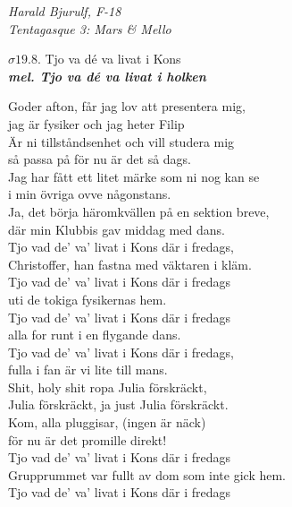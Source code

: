 \documentclass[a6paper,10pt]{article}
\newcommand{\mel}[1]{\small\textbf{\textit{mel. #1 \\}}}
\begin{document}
\begin{flushright}
\textit{Harald Bjurulf, F-18 \\ Tentagasque 3: Mars \& Mello}
\end{flushright}

\setlength{\oddsidemargin}{-0.47in}
\begin{center}


\Large $\sigma19.8$. Tjo va dé va livat i Kons \\
\mel{Tjo va dé va livat i holken}
\end{center} \small
Goder afton, får jag lov att presentera mig,\\
jag är fysiker och jag heter Filip\\
Är ni tillståndsenhet och vill studera mig\\
så passa på för nu är det så dags.\\
Jag har fått ett litet märke som ni nog kan se\\
i min övriga ovve någonstans.\\
Ja, det börja häromkvällen på en sektion breve,\\
där min Klubbis gav middag med dans.
\vspace{5pt}\\
Tjo vad de’ va’ livat i Kons där i fredags,\\
Christoffer, han fastna med väktaren i kläm.\\
Tjo vad de’ va’ livat i Kons där i fredags\\
uti de tokiga fysikernas hem.\\
Tjo vad de’ va’ livat i Kons där i fredags\\
alla for runt i en flygande dans.\\
Tjo vad de’ va’ livat i Kons där i fredags,\\
fulla i fan är vi lite till mans.
\vspace{5pt}\\
Shit, holy shit ropa Julia förskräckt,\\
Julia förskräckt, ja just Julia förskräckt.\\
Kom, alla pluggisar, (ingen är näck) \\
för nu är det promille direkt!
\vspace{5pt}\\
Tjo vad de’ va’ livat i Kons där i fredags\\
Grupprummet var fullt av dom som inte gick hem.\\
Tjo vad de’ va’ livat i Kons där i fredags\\
\end{document}
